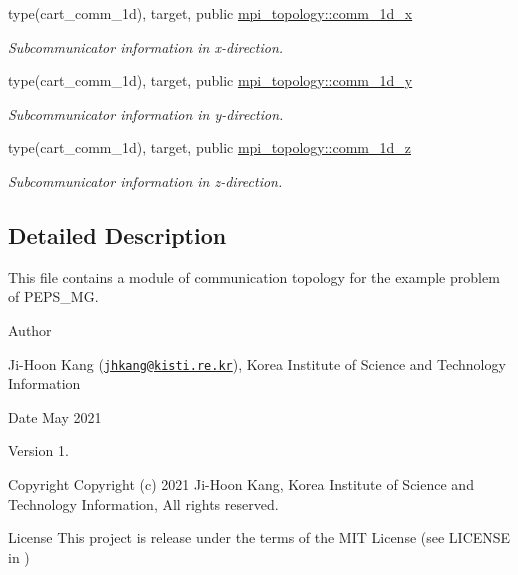 \begin{DoxyCompactItemize}
\mbox{\label{namespacempi__topology_a67d857c7a471473332bbfcac7682943c}} 
type(cart\+\_\+comm\+\_\+1d), target, public \hyperlink{namespacempi__topology_a67d857c7a471473332bbfcac7682943c}{mpi\+\_\+topology\+::comm\+\_\+1d\+\_\+x}
\begin{DoxyCompactList}\small\item\em Subcommunicator information in x-\/direction. \end{DoxyCompactList}\item 
\mbox{\label{namespacempi__topology_a4f667ff8f1bbfd8075bd7629cba14c2d}} 
type(cart\+\_\+comm\+\_\+1d), target, public \hyperlink{namespacempi__topology_a4f667ff8f1bbfd8075bd7629cba14c2d}{mpi\+\_\+topology\+::comm\+\_\+1d\+\_\+y}
\begin{DoxyCompactList}\small\item\em Subcommunicator information in y-\/direction. \end{DoxyCompactList}\item 
\mbox{\label{namespacempi__topology_a9d5db9f9841b438a50d1809aaf8f0efc}} 
type(cart\+\_\+comm\+\_\+1d), target, public \hyperlink{namespacempi__topology_a9d5db9f9841b438a50d1809aaf8f0efc}{mpi\+\_\+topology\+::comm\+\_\+1d\+\_\+z}
\begin{DoxyCompactList}\small\item\em Subcommunicator information in z-\/direction. \end{DoxyCompactList}\end{DoxyCompactItemize}


\subsection{Detailed Description}
This file contains a module of communication topology for the example problem of P\+E\+P\+S\+\_\+\+MG. 

\begin{DoxyAuthor}{Author}

\begin{DoxyItemize}
\item Ji-\/\+Hoon Kang (\href{mailto:jhkang@kisti.re.kr}{\tt jhkang@kisti.\+re.\+kr}), Korea Institute of Science and Technology Information
\end{DoxyItemize}
\end{DoxyAuthor}
\begin{DoxyDate}{Date}
May 2021 
\end{DoxyDate}
\begin{DoxyVersion}{Version}
1. 
\end{DoxyVersion}
\begin{DoxyParagraph}{Copyright}
Copyright (c) 2021 Ji-\/\+Hoon Kang, Korea Institute of Science and Technology Information, All rights reserved. 
\end{DoxyParagraph}
\begin{DoxyParagraph}{License }
This project is release under the terms of the M\+IT License (see L\+I\+C\+E\+N\+SE in ) 
\end{DoxyParagraph}
